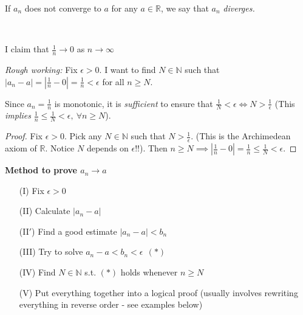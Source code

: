 \begin{definition}
If $a_n$ does not converge to $a$ for any $a\in \mathbb{R}$, we say that $a_n$ \emph{diverges.}
\end{definition}~

\begin{example}
I claim that $\frac{1}{n} \to 0$ as $n \to \infty$

\textit{Rough working:} Fix $\epsilon >0$. I want to find $N \in \mathbb{N}$ such that $|a_n - a| = |\frac{1}{n} - 0| = \frac{1}{n} < \epsilon$ for all $n \geq N$. 
\begin{center}
\end{center}


Since $a_n = \frac{1}{n}$ is monotonic, it is \emph{sufficient} to ensure that $\frac{1}{N} < \epsilon \iff N > \frac{1}{\epsilon}$ (This \emph{implies} $\frac{1}{n} \leq \frac{1}{N} < \epsilon,~\forall n \geq N$).

\begin{proof}
Fix $\epsilon >0$. 
 Pick any $N \in \mathbb{N}$ such that $N > \frac{1}{\epsilon}$. (This is the Archimedean axiom of $\mathbb{R}$. Notice $N$ depends on $\epsilon$!!). Then $n \geq N \implies |\frac{1}{n}-0| = \frac{1}{n} \leq \frac{1}{N} < \epsilon$.
\end{proof}


\end{example}


\textbf{Method to prove $a_n \to a$}
\begin{enumerate}
\item[(I)] Fix $\epsilon > 0$
\item[(II)] Calculate $|a_n - a|$
\item[(II$'$)] Find a good estimate $|a_n - a| < b_n$
\item[(III)] Try to solve $a_n - a < b_n < \epsilon ~~(*)$
\item[(IV)] Find $N \in \mathbb{N}$ s.t. $(*)$ holds whenever $n \geq N$
\item[(V)] Put everything together into a logical proof (usually involves rewriting everything in reverse order - see examples below)
\end{enumerate}~

